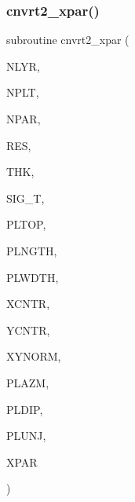 \mbox{\label{Leroi__c_8f90_aa8246fcc58fb68567634de3315aa33d2}} 
\subsubsection{\texorpdfstring{cnvrt2\+\_\+xpar()}{cnvrt2\_xpar()}}
{\footnotesize\ttfamily subroutine cnvrt2\+\_\+xpar (\begin{DoxyParamCaption}\item[{integer}]{N\+L\+YR,  }\item[{integer}]{N\+P\+LT,  }\item[{integer}]{N\+P\+AR,  }\item[{real, dimension(nlyr)}]{R\+ES,  }\item[{real, dimension(nlyr)}]{T\+HK,  }\item[{real, dimension(nplt)}]{S\+I\+G\+\_\+T,  }\item[{real, dimension(nplt)}]{P\+L\+T\+OP,  }\item[{real, dimension(nplt)}]{P\+L\+N\+G\+TH,  }\item[{real, dimension(nplt)}]{P\+L\+W\+D\+TH,  }\item[{real, dimension(nplt)}]{X\+C\+N\+TR,  }\item[{real, dimension(nplt)}]{Y\+C\+N\+TR,  }\item[{real, dimension(nplt)}]{X\+Y\+N\+O\+RM,  }\item[{real, dimension(nplt)}]{P\+L\+A\+ZM,  }\item[{real, dimension(nplt)}]{P\+L\+D\+IP,  }\item[{real, dimension(nplt)}]{P\+L\+U\+NJ,  }\item[{real, dimension(npar)}]{X\+P\+AR }\end{DoxyParamCaption})}

\mbox{\label{Leroi__c_8f90_a0801b4ca30057cb8ddfb94e49185a2ce}} 
